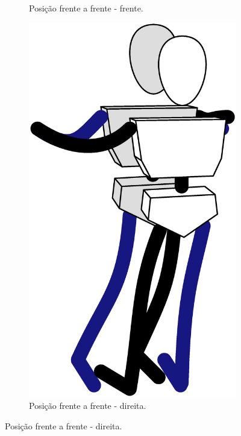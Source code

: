 \begin{figure}[!ht]
\begin{subfigure}[b]{0.20\textwidth}
         \caption{Posição frente a frente - frente.}
         \label{fig:positiongeralsamba:fff}
     \end{subfigure}
     \hfill
     \begin{subfigure}[b]{0.245\textwidth}
         \centering
         \includegraphics[width=\textwidth]{chapters/cap-normas/position-ffd.eps}
         \caption{Posição frente a frente - direita.}
         \label{fig:positiongeralsamba:ffd}
     \end{subfigure}

\end{figure}
